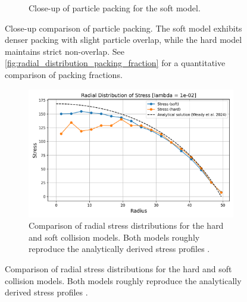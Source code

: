 \documentclass[conference]{IEEEtran}
\begin{document}
\begin{figure}[H]
\begin{subfigure}[b]{0.49\columnwidth}
        \caption{Close-up of particle packing for the soft model.}
        \label{fig:packing_soft}
    \end{subfigure}
    \caption{Close-up comparison of particle packing. The soft model exhibits denser packing with slight particle overlap, while the hard model maintains strict non-overlap. See \autoref{fig:radial_distribution_packing_fraction} for a quantitative comparison of packing fractions.}
    \label{fig:dense_packing_comparison}
\end{figure}



\newpage

\begin{figure}[H]
    \centering
    \begin{subfigure}[b]{\linewidth}
        \centering
        \includegraphics[width=\linewidth]{figures/comparisons/radial_distribution_stress.png}
        \caption{Comparison of radial stress distributions for the hard and soft collision models. Both models roughly reproduce the analytically derived stress profiles \cite{Weady2024}.}
        \label{fig:radial_distribution_stress}
    \end{subfigure}

    \vspace{0.5em}


\end{figure}
\end{document}
